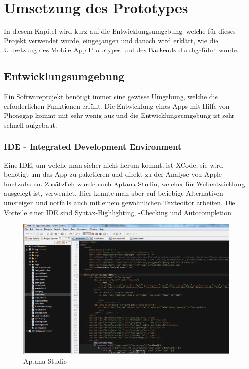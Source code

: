 %
%

\chapter{Umsetzung des Prototypes}\label{chap.umsetzung}
In diesem Kapitel wird kurz auf die Entwicklungsumgebung, welche für dieses Projekt verwendet wurde, eingegangen und danach wird erklärt, wie die Umsetzung des Mobile App Prototypes und des Backends durchgeführt wurde.

\section{Entwicklungsumgebung}\label{entwicklungsumgebung}
Ein Softwareprojekt benötigt immer eine gewisse Umgebung, welche die erforderlichen Funktionen erfüllt. Die Entwicklung eines Apps mit Hilfe von Phonegap kommt mit sehr wenig aus und die Entwicklungsumgebung ist sehr schnell aufgebaut.

\subsection{IDE - Integrated Development Environment}
Eine IDE, um welche man sicher nicht herum kommt, ist XCode, sie wird benötigt um das App zu paketieren und direkt zu der Analyse von Apple hochzuladen. Zusätzlich wurde noch Aptana Studio, welches für Webentwicklung ausgelegt ist, verwendet. Hier konnte man aber auf beliebige Alternativen umsteigen und notfalls auch mit einem gewöhnlichen Texteditor arbeiten. Die Vorteile einer IDE sind Syntax-Highlighting, -Checking und Autocompletion.

\begin{figure}[h]
\centering
\includegraphics[scale=0.5]{images/aptana.png}
\caption{Aptana Studio}
\label{fig:aptana}
\end{figure}


